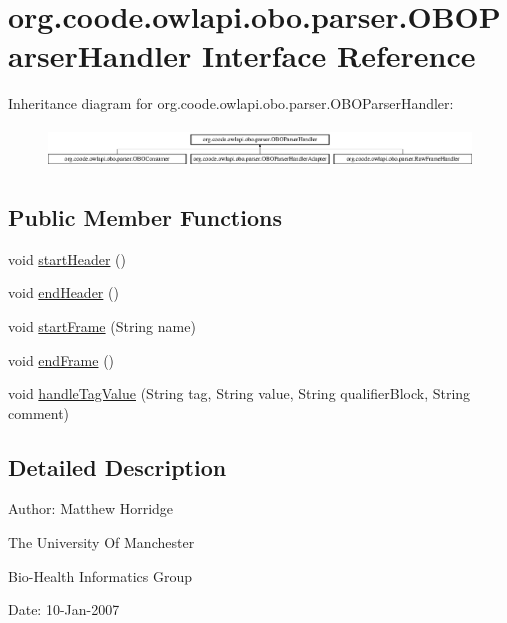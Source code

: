 \hypertarget{interfaceorg_1_1coode_1_1owlapi_1_1obo_1_1parser_1_1_o_b_o_parser_handler}{\section{org.\-coode.\-owlapi.\-obo.\-parser.\-O\-B\-O\-Parser\-Handler Interface Reference}
\label{interfaceorg_1_1coode_1_1owlapi_1_1obo_1_1parser_1_1_o_b_o_parser_handler}
}
Inheritance diagram for org.\-coode.\-owlapi.\-obo.\-parser.\-O\-B\-O\-Parser\-Handler\-:\begin{figure}[H]
\begin{center}
\leavevmode
\includegraphics[height=1.085271cm]{interfaceorg_1_1coode_1_1owlapi_1_1obo_1_1parser_1_1_o_b_o_parser_handler}
\end{center}
\end{figure}
\subsection*{Public Member Functions}
\begin{DoxyCompactItemize}
\item 
void \hyperlink{interfaceorg_1_1coode_1_1owlapi_1_1obo_1_1parser_1_1_o_b_o_parser_handler_aa7a6a215b0f3af39dd18fd76c6a77f70}{start\-Header} ()
\item 
void \hyperlink{interfaceorg_1_1coode_1_1owlapi_1_1obo_1_1parser_1_1_o_b_o_parser_handler_aba10a88a5ffde177c5701902e57aa74e}{end\-Header} ()
\item 
void \hyperlink{interfaceorg_1_1coode_1_1owlapi_1_1obo_1_1parser_1_1_o_b_o_parser_handler_a86b686534bdb928c37e5cf265ee68a85}{start\-Frame} (String name)
\item 
void \hyperlink{interfaceorg_1_1coode_1_1owlapi_1_1obo_1_1parser_1_1_o_b_o_parser_handler_ad9161714a9d3626b7e2af29502a848f9}{end\-Frame} ()
\item 
void \hyperlink{interfaceorg_1_1coode_1_1owlapi_1_1obo_1_1parser_1_1_o_b_o_parser_handler_ac8b72b1df7843012daeae0b4c9212cc2}{handle\-Tag\-Value} (String tag, String value, String qualifier\-Block, String comment)
\end{DoxyCompactItemize}


\subsection{Detailed Description}
Author\-: Matthew Horridge\par
 The University Of Manchester\par
 Bio-\/\-Health Informatics Group\par
 Date\-: 10-\/\-Jan-\/2007\par
\par
 

